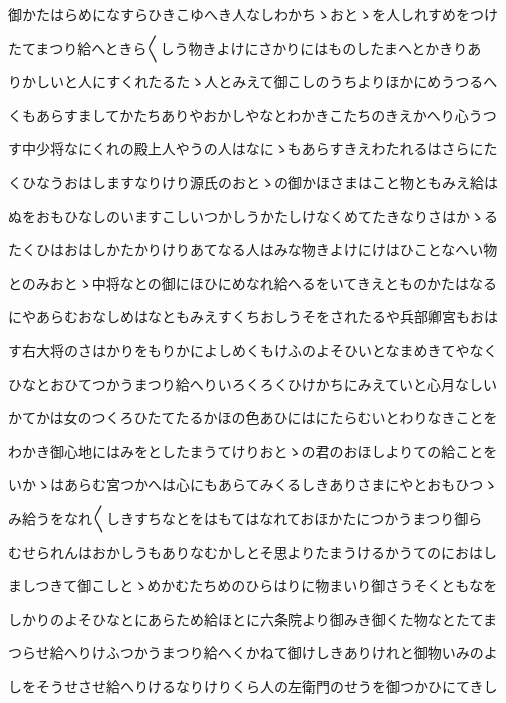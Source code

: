 \documentclass[a4paper,11pt,landscape]{ltjtarticle}
\begin{document}
\par\medskip
御かたはらめになすらひきこゆへき人なしわかちゝおとゝを人しれすめをつけ
\par\medskip
たてまつり給へときら〱しう物きよけにさかりにはものしたまへとかきりあ
\par\medskip
りかしいと人にすくれたるたゝ人とみえて御こしのうちよりほかにめうつるへ
\par\medskip
くもあらすましてかたちありやおかしやなとわかきこたちのきえかへり心うつ
\par\medskip
す中少将なにくれの殿上人やうの人はなにゝもあらすきえわたれるはさらにた
\par\medskip
くひなうおはしますなりけり源氏のおとゝの御かほさまはこと物ともみえ給は
\par\medskip
ぬをおもひなしのいますこしいつかしうかたしけなくめてたきなりさはかゝる
\par\medskip
たくひはおはしかたかりけりあてなる人はみな物きよけにけはひことなへい物
\par\medskip
とのみおとゝ中将なとの御にほひにめなれ給へるをいてきえとものかたはなる
\par\medskip
にやあらむおなしめはなともみえすくちおしうそをされたるや兵部卿宮もおは
\par\medskip
す右大将のさはかりをもりかによしめくもけふのよそひいとなまめきてやなく
\par\medskip
ひなとおひてつかうまつり給へりいろくろくひけかちにみえていと心月なしい
\par\medskip
かてかは女のつくろひたてたるかほの色あひにはにたらむいとわりなきことを
\par\medskip
わかき御心地にはみをとしたまうてけりおとゝの君のおほしよりての給ことを
\par\medskip
いかゝはあらむ宮つかへは心にもあらてみくるしきありさまにやとおもひつゝ
\par\medskip
み給うをなれ〱しきすちなとをはもてはなれておほかたにつかうまつり御ら
\par\medskip
むせられんはおかしうもありなむかしとそ思よりたまうけるかうてのにおはし
\par\medskip
ましつきて御こしとゝめかむたちめのひらはりに物まいり御さうそくともなを
\par\medskip
しかりのよそひなとにあらため給ほとに六条院より御みき御くた物なとたてま
\par\medskip
つらせ給へりけふつかうまつり給へくかねて御けしきありけれと御物いみのよ
\par\medskip
しをそうせさせ給へりけるなりけりくら人の左衛門のせうを御つかひにてきし
\end{document}
